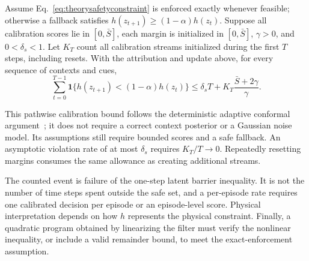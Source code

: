 \begin{proposition}\label{prop:safety}
Assume Eq.~\eqref{eq:theorysafetyconstraint} is enforced exactly whenever feasible; otherwise a fallback satisfies $h(z_{t+1})\ge(1-\alpha)h(z_t)$. Suppose all calibration scores lie in $[0,\bar S]$, each margin is initialized in $[0,\bar S]$, $\gamma>0$, and $0<\delta_s<1$. Let $K_T$ count all calibration streams initialized during the first $T$ steps, including resets. With the attribution and update above, for every sequence of contexts and cues,
\begin{equation}\label{eq:safetybound}
\sum_{t=0}^{T-1}\mathbf1\{h(z_{t+1})<(1-\alpha)h(z_t)\}
\le\delta_sT+K_T\frac{\bar S+2\gamma}{\gamma}.
\end{equation}
\end{proposition}
This pathwise calibration bound follows the deterministic adaptive conformal argument~\citep{gibbs2021adaptive}; it does not require a correct context posterior or a Gaussian noise model. Its assumptions still require bounded scores and a safe fallback. An asymptotic violation rate of at most $\delta_s$ requires $K_T/T\to0$. Repeatedly resetting margins consumes the same allowance as creating additional streams.

The counted event is failure of the one-step latent barrier inequality. It is not the number of time steps spent outside the safe set, and a per-episode rate requires one calibrated decision per episode or an episode-level score. Physical interpretation depends on how $h$ represents the physical constraint. Finally, a quadratic program obtained by linearizing the filter must verify the nonlinear inequality, or include a valid remainder bound, to meet the exact-enforcement assumption.
